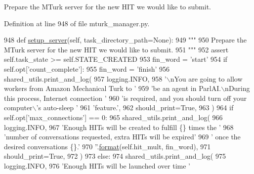 \begin{DoxyVerb}Prepare the MTurk server for the new HIT we would like to submit.
\end{DoxyVerb}
 

Definition at line 948 of file mturk\+\_\+manager.\+py.


\begin{DoxyCode}
948     \textcolor{keyword}{def }\hyperlink{namespaceparlai_1_1chat__service_1_1services_1_1messenger_1_1server__utils_afb56b04206cd0f42384438f1ac6d9cda}{setup\_server}(self, task\_directory\_path=None):
949         \textcolor{stringliteral}{"""}
950 \textcolor{stringliteral}{        Prepare the MTurk server for the new HIT we would like to submit.}
951 \textcolor{stringliteral}{        """}
952         \textcolor{keyword}{assert} self.task\_state >= self.STATE\_CREATED
953         fin\_word = \textcolor{stringliteral}{'start'}
954         \textcolor{keywordflow}{if} self.opt[\textcolor{stringliteral}{'count\_complete'}]:
955             fin\_word = \textcolor{stringliteral}{'finish'}
956         shared\_utils.print\_and\_log(
957             logging.INFO,
958             \textcolor{stringliteral}{'\(\backslash\)nYou are going to allow workers from Amazon Mechanical Turk to '}
959             \textcolor{stringliteral}{'be an agent in ParlAI.\(\backslash\)nDuring this process, Internet connection '}
960             \textcolor{stringliteral}{'is required, and you should turn off your computer\(\backslash\)'s auto-sleep '}
961             \textcolor{stringliteral}{'feature.'},
962             should\_print=\textcolor{keyword}{True},
963         )
964         \textcolor{keywordflow}{if} self.opt[\textcolor{stringliteral}{'max\_connections'}] == 0:
965             shared\_utils.print\_and\_log(
966                 logging.INFO,
967                 \textcolor{stringliteral}{'Enough HITs will be created to fulfill \{\} times the '}
968                 \textcolor{stringliteral}{'number of conversations requested, extra HITs will be expired'}
969                 \textcolor{stringliteral}{' once the desired conversations \{\}.'}
970                 \textcolor{stringliteral}{''}.\hyperlink{namespaceparlai_1_1chat__service_1_1services_1_1messenger_1_1shared__utils_a32e2e2022b824fbaf80c747160b52a76}{format}(self.hit\_mult, fin\_word),
971                 should\_print=\textcolor{keyword}{True},
972             )
973         \textcolor{keywordflow}{else}:
974             shared\_utils.print\_and\_log(
975                 logging.INFO,
976                 \textcolor{stringliteral}{'Enough HITs will be launched over time '}

\end{DoxyCode}
